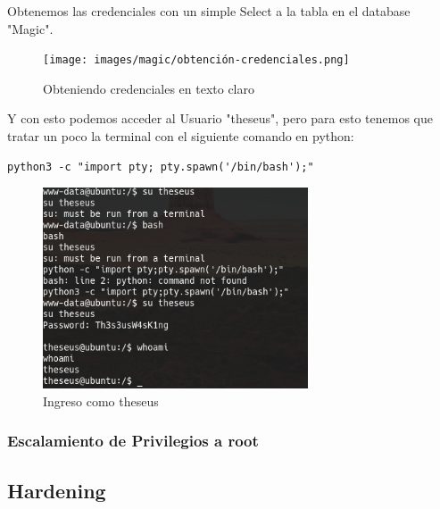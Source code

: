 \documentclass{article}
\begin{document}
\clearpage

Obtenemos las credenciales con un simple Select a la tabla en el database "Magic".
\begin{figure}[h!]
	\center 
	\texttt{[image: images/magic/obtención-credenciales.png]}
	\caption{Obteniendo credenciales en texto claro}
\end{figure}

Y con esto podemos acceder al Usuario "theseus", pero para esto tenemos que tratar un poco la terminal con el siguiente comando en python:
\begin{lstlisting}
python3 -c "import pty; pty.spawn('/bin/bash');"
\end{lstlisting}

\begin{figure}[h!]
	\center 
	\includegraphics[width=0.7\textwidth]{images/magic/ingreso-existoso.png}
	\caption{Ingreso como theseus}
\end{figure}

\clearpage

\subsubsection{Escalamiento de Privilegios a root}

\subsection{Hardening}
\end{document}

